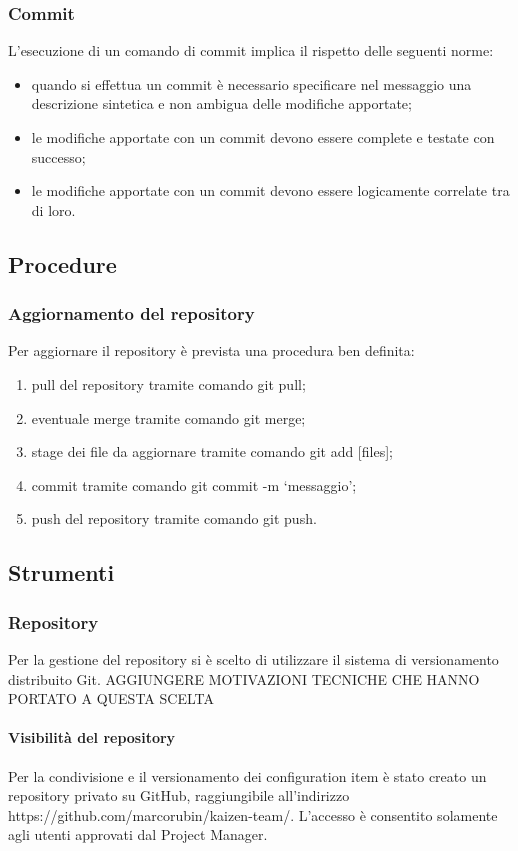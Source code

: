 			\subsubsection{Commit}
				L'esecuzione di un comando di commit implica il rispetto delle seguenti norme:
				\begin{itemize}
					\item quando si effettua un commit è necessario specificare nel messaggio una descrizione sintetica e non ambigua delle modifiche apportate;
					\item le modifiche apportate con un commit devono essere complete e testate con successo;
					\item le modifiche apportate con un commit devono essere logicamente correlate tra di loro.
				\end{itemize}
	
	\subsection{Procedure}
		\subsubsection{Aggiornamento del repository}
				Per aggiornare il repository è prevista una procedura ben definita:
				\begin{enumerate}
					\item pull del repository tramite comando git pull;
					\item eventuale merge tramite comando git merge;
					\item stage dei file da aggiornare tramite comando git add [files];
					\item commit tramite comando git commit -m ‘messaggio’;
					\item push del repository tramite comando git push.
				\end{enumerate}
		
	\subsection{Strumenti}	
		\subsubsection{Repository}
			Per la gestione del repository si è scelto di utilizzare il sistema di versionamento distribuito Git. AGGIUNGERE MOTIVAZIONI TECNICHE CHE HANNO PORTATO A QUESTA SCELTA
				\paragraph{Visibilità del repository}
				Per la condivisione e il versionamento dei configuration item è stato creato un repository privato su GitHub, raggiungibile all’indirizzo https://github.com/marcorubin/kaizen-team/. L’accesso è consentito solamente agli utenti approvati dal Project Manager.
						
